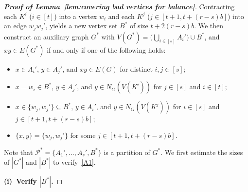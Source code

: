 \documentclass[11pt, a4paper]{article}
\theoremstyle{definition}
\newcommand{\<}{\subseteq}
\begin{document}
\begin{proof}[{\bf Proof of Lemma~\ref{lem:covering bad vertices for balance}}]
Contracting each $K^i$ ($i\in [t]$) into a vertex $w_i$ and each $K^j$ ($j\in [t+1,t+(r-s)b]$) into an edge $w_jw_j'$, yields a new vertex set $B^*$ of size $t+2(r-s)b$. 
We then construct an auxiliary graph $G^*$ with $V(G^*)=\big (\bigcup_{i\in[s]}A_i'\big)\cup B^*$, and $xy\in E(G^*)$ if and only if one of the following holds:
\begin{itemize}
    \item $x\in A_i'$, $y\in A_j'$, and $xy\in E(G)$ for distinct $i,j\in[s]$; 
    \item $x=w_i\in B^*$, $y\in A_j'$, and $y\in N_G(V(K^i))$ for $j\in [s]$ and $i\in[t]$;
    \item $x\in \{w_j,w_j'\}\subseteq B^*$, $y\in A_i'$, and $y\in N_G(V(K^j))$ for $i\in [s]$ and $j\in[{t+1,t+(r-s)b}]$;
    \item $\{x,y\}=\{w_j,w_j'\}$ for some $j\in[t+1,t+(r-s)b].$
\end{itemize}
Note that $\mathcal{P}^*=\{A_1',\ldots,A_s',B^*\}$ is a partition of $G^*$.  We first estimate the sizes of $|G^*|$ and $|B^*|$ to verify~\ref{A1}. 
\medskip

\textbf{(i)~Verify $|B^*|$.}\medskip



\end{proof}
\end{document}
